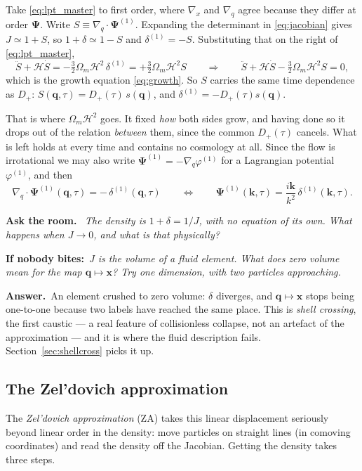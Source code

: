 \documentclass[a4paper,11pt]{article}
\newcommand{\vx}{\bm{x}}
\newcommand{\vq}{\bm{q}}
\newcommand{\vk}{\bm{k}}
\newcommand{\vPsi}{\bm{\Psi}}
\def\cH{\mathcal{H}}
\def\Om{\Omega_m}
\numberwithin{equation}{section}
\newenvironment{quiz}
  {\par\medskip\noindent\begingroup\small\color{RoyalBlue!65!black}%
   \textbf{Ask the room.}\ \itshape}
  {\endgroup\par\medskip}
\newcommand{\nudge}[1]{\upshape\par\smallskip\hspace*{1.2em}\textbf{If nobody bites:}\ \itshape #1}
\newcommand{\answer}[1]{\upshape\par\smallskip\hspace*{1.2em}\textbf{Answer.}\ #1}
\begin{document}
Take \eqref{eq:lpt_master} to first order, where $\nabla_x$ and $\nabla_q$
agree because they differ at order $\vPsi$. Write $S \equiv \nabla_q\cdot
\vPsi^{(1)}$. Expanding the determinant in \eqref{eq:jacobian} gives
$J \simeq 1 + S$, so $1+\delta \simeq 1-S$ and $\delta^{(1)} = -S$. Substituting
that on the right of \eqref{eq:lpt_master},
\begin{equation*}
\ddot S + \cH\dot S = -\tfrac32\Om\cH^2\,\delta^{(1)} = +\tfrac32\Om\cH^2 S
\qquad\Longrightarrow\qquad
\ddot S + \cH\dot S - \tfrac32\Om\cH^2 S = 0 ,
\end{equation*}
which is the growth equation \eqref{eq:growth}. So $S$ carries the same time
dependence as $D_+$: $S(\vq,\tau) = D_+(\tau)\,s(\vq)$, and
$\delta^{(1)} = -D_+(\tau)s(\vq)$.

That is where $\Om\cH^2$ goes. It fixed \emph{how} both sides grow, and having
done so it drops out of the relation \emph{between} them, since the common
$D_+(\tau)$ cancels. What is left holds at every time and contains no cosmology
at all. Since the flow is irrotational we may also write $\vPsi^{(1)} =
-\nabla_q\varphi^{(1)}$ for a Lagrangian potential $\varphi^{(1)}$, and then
\begin{equation}
\nabla_q\cdot\vPsi^{(1)}(\vq,\tau) = -\,\delta^{(1)}(\vq,\tau)
\qquad\Longleftrightarrow\qquad
\vPsi^{(1)}(\vk,\tau) = \frac{i\vk}{k^2}\,\delta^{(1)}(\vk,\tau) .
\label{eq:za_displacement}
\end{equation}
\begin{quiz}
The density is $1+\delta = 1/J$, with no equation of its own. What happens when
$J \to 0$, and what is that physically?
\nudge{$J$ is the volume of a fluid element. What does zero volume mean for the
map $\vq \mapsto \vx$? Try one dimension, with two particles approaching.}
\answer{An element crushed to zero volume: $\delta$ diverges, and
$\vq \mapsto \vx$ stops being one-to-one because two labels have reached the
same place. This is \emph{shell crossing}, the first caustic --- a real feature
of collisionless collapse, not an artefact of the approximation --- and it is
where the fluid description fails. Section~\ref{sec:shellcross} picks it up.}
\end{quiz}

\subsection{The Zel'dovich approximation}
\label{sec:za}

The \emph{Zel'dovich approximation} (ZA) \cite{Zeldovich1970} takes this linear displacement seriously beyond linear order in the density: move particles on straight lines (in comoving coordinates) and read the density
off the Jacobian. Getting the density takes three steps.
\end{document}
